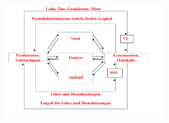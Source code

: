 \documentclass{article} %
\begin{document}
	\par
	\includegraphics[keepaspectratio, width=7cm]{Wirtschaftskreislauf.png}
	\newpage
	 \begin{multicols*}{4}
	 \begin{flushleft}
	 \begin{tiny}
	 \end{tiny}
	 \end{flushleft}
	\end{multicols*}
\end{document}
